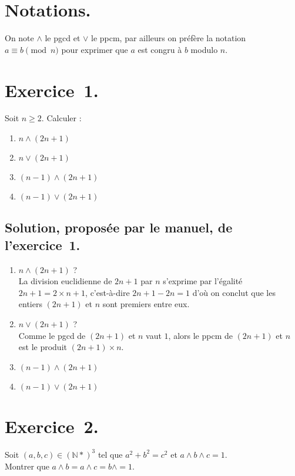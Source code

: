 \documentclass[a4paper,14pt]{extarticle} %
\def\eclaire{\mathbb}
\def\N{\ensuremath{\eclaire N}}
\begin{document}
 



\setlength{\parindent}{0pt}



\section*{Notations.}

On note $\wedge$ le pgcd et $\vee$ le ppcm, par ailleurs on préfère la notation $a\equiv b \pmod{n}$ pour exprimer que $a$ est congru à $b$ modulo $n$.

\section*{Exercice~1.}

Soit $n\geqslant 2$. Calculer :
\begin{enumerate}
\item $n \wedge (2n+1)$
\item $n \vee (2n+1)$
\item $(n-1)\wedge(2n+1)$
\item $(n-1)\vee(2n+1)$
\end{enumerate}


\subsection*{Solution, proposée par le manuel, de l'exercice~1.}
\begin{enumerate}
\item $n \wedge (2n+1)$ ?\\
La division euclidienne de $2n+1$ par $n$ s'exprime par l'égalité $2n+1= 2\times n +1$, c'est-à-dire $2n+1-2n=1$ d'où on conclut que les entiers $(2n+1)$ et $n$ sont premiers entre eux.
\item $n \vee (2n+1)$ ?\\
Comme le pgcd de $(2n+1)$ et $n$ vaut $1$, alors le ppcm de $(2n+1)$ et $n$ est le produit $(2n+1) \times n$.
\item $(n-1)\wedge(2n+1)$
\item $(n-1)\vee(2n+1)$
\end{enumerate}


\section*{Exercice~2.}

Soit $(a,b,c) \in (\N*)^3$ tel que $a^2+b^2=c^2$ et $ a \wedge b \wedge c =1$.\\ Montrer que $a \wedge b = a \wedge c = b \wedge =1$.
\end{document}
